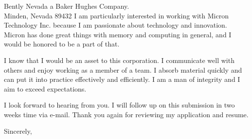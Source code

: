 \documentclass{letter} %
\begin{document}
\begin{large}
\begin{letter}{Bently Nevada a Baker Hughes Company.\\
Minden, Nevada 89432}
\noindent I am particularly interested in working with Micron Technology Inc. because I am passionate about technology and innovation. Micron has done great things with memory and computing in general, and I would be honored to be a part of that.


\noindent I know that I would be an asset to this corporation. I communicate well with others and enjoy working as a member of a team. I absorb material quickly and can put it into practice effectively and efficiently. I am a man of integrity and I aim to exceed expectations.

\noindent I look forward to hearing from you.  I will follow up on this submission in two weeks time via e-mail.  Thank you again for reviewing my application and resume. 




 
\closing{Sincerely,} 
 

 

\end{letter}
 \end{large}
\end{document}
